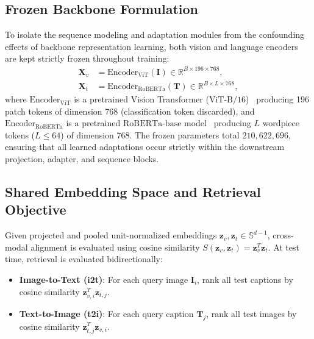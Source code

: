 \documentclass[10pt,journal,final]{IEEEtran}
\begin{document}
\subsection{Frozen Backbone Formulation}
To isolate the sequence modeling and adaptation modules from the confounding effects of backbone representation learning, both vision and language encoders are kept strictly frozen throughout training:
\begin{align}
\label{eq:frozen_vision}
\mathbf{X}_v &= \mathrm{Encoder}_{\mathrm{ViT}}(\mathbf{I}) \in \mathbb{R}^{B \times 196 \times 768}, \\
\label{eq:frozen_lang}
\mathbf{X}_t &= \mathrm{Encoder}_{\mathrm{RoBERTa}}(\mathbf{T}) \in \mathbb{R}^{B \times L \times 768},
\end{align}
where $\mathrm{Encoder}_{\mathrm{ViT}}$ is a pretrained Vision Transformer ($\mathrm{ViT\text{-}B/16}$)~\cite{dosovitskiy2021image} producing 196 patch tokens of dimension 768 (classification token discarded), and $\mathrm{Encoder}_{\mathrm{RoBERTa}}$ is a pretrained $\mathrm{RoBERTa\text{-}base}$ model~\cite{liu2019roberta} producing $L$ wordpiece tokens ($L \le 64$) of dimension 768. The frozen parameters total $210,622,696$, ensuring that all learned adaptations occur strictly within the downstream projection, adapter, and sequence blocks.

\subsection{Shared Embedding Space and Retrieval Objective}
Given projected and pooled unit-normalized embeddings $\mathbf{z}_v, \mathbf{z}_t \in \mathbb{S}^{d-1}$, cross-modal alignment is evaluated using cosine similarity $S(\mathbf{z}_v, \mathbf{z}_t) = \mathbf{z}_v^T \mathbf{z}_t$. At test time, retrieval is evaluated bidirectionally:
\begin{itemize}
    \item \textbf{Image-to-Text (i2t)}: For each query image $\mathbf{I}_i$, rank all test captions by cosine similarity $\mathbf{z}_{v, i}^T \mathbf{z}_{t, j}$.
    \item \textbf{Text-to-Image (t2i)}: For each query caption $\mathbf{T}_j$, rank all test images by cosine similarity $\mathbf{z}_{t, j}^T \mathbf{z}_{v, i}$.
\end{itemize}
\end{document}
